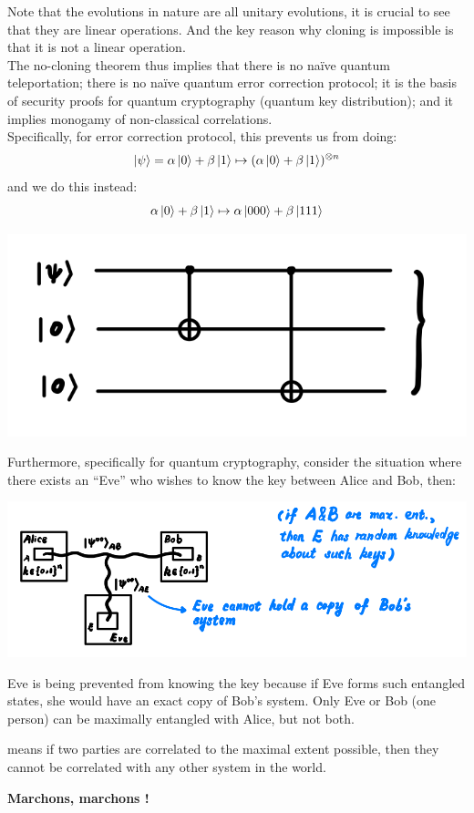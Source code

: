 Note that the evolutions in nature are all unitary evolutions, it is crucial to see that they are linear operations. And the key reason why cloning is impossible is that it is not a linear operation. \\
The no-cloning theorem thus implies that there is no na\"ive quantum teleportation; there is no na\"ive quantum error correction protocol; it is the basis of security proofs for quantum cryptography (quantum key distribution); and it implies monogamy of non-classical correlations. \\
Specifically, for error correction protocol, this prevents us from doing:
$$\ket{\psi} = \alpha \ket{0} + \beta \ket{1} \mapsto (\alpha \ket{0} + \beta \ket{1})^{\otimes n}$$
and we do this instead:
$$\alpha \ket{0} + \beta \ket{1} \mapsto \alpha\ket{000} + \beta\ket{111}$$
\begin{center}
    \includegraphics[scale = 1]{error-correction.png}
\end{center}
Furthermore, specifically for quantum cryptography, consider the situation where there exists an ``Eve'' who wishes to know the key between Alice and Bob, then:
\begin{center}
    \includegraphics[scale = 0.75]{quantum-security.png}
\end{center}
Eve is being prevented from knowing the key because if Eve forms such entangled states, she would have an exact copy of Bob's system. Only Eve or Bob (one person) can be maximally entangled with Alice, but not both.
\begin{definition}
     means if two parties are correlated to the maximal extent possible, then they cannot be correlated with any other system in the world.
\end{definition}
\bigskip
\begin{center}
    {\huge \textbf{Marchons, marchons !}}
\end{center}